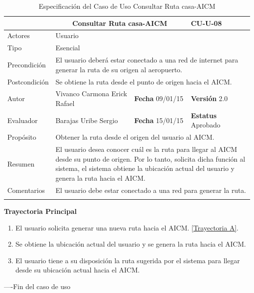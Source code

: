 \begin{longtable}{|p{2.5cm}|p{6.4cm}|p{2cm}|p{2cm}|}
	\hline
		\rowcolor[RGB]{51,153,255}{Caso de Uso}&\multicolumn{2}{c}{Consultar Ruta casa-AICM}&{\textbf{CU-U-08}}\\
	\hline
		{Actores}&\multicolumn{3}{p{11.2cm}|}{Usuario}\\
	\hline
		{Tipo}&\multicolumn{3}{p{11.2cm}|}{Esencial}\\
	\hline
		{Precondición}&\multicolumn{3}{p{11.2cm}|}{El usuario deberá estar conectado a una red de internet para generar la ruta de su origen al aeropuerto.}\\
	\hline
		{Postcondición}&\multicolumn{3}{p{11.2cm}|}{Se obtiene la ruta desde el punto de origen hacia el AICM.}\\
	\hline
		{Autor}&{Vivanco Carmona Erick Rafael}&{\textbf{Fecha} 09/01/15}&{\textbf{Versión} 2.0}\\
			\hline
		{Evaluador}&{Barajas Uribe Sergio}&{\textbf{Fecha} 15/01/15}&{\textbf{Estatus} Aprobado}\\
	\hline
		{Propósito}&\multicolumn{3}{p{11.2cm}|}{Obtener la ruta desde el origen del usuario al AICM.}\\
	\hline
		{Resumen}&\multicolumn{3}{p{11.2cm}|}{El usuario desea conocer cuál es la ruta para llegar al AICM desde su punto de origen. Por lo tanto, solicita dicha función al sistema, el sistema obtiene la ubicación actual del usuario y  genera la ruta hacia el AICM.}\\	
	\hline
		{Comentarios}&\multicolumn{3}{p{11.2cm}|}{El usuario debe estar conectado a una red para generar la ruta.}\\
	\hline
	\caption[Especificación del Caso de Uso Consultar Ruta casa-AICM]{Especificación del Caso de Uso Consultar Ruta casa-AICM}
    	\label{tab:cuConsultarRutacasa-AICM}
\end{longtable}
\clearpage

\begin{flushleft}
	\textbf{Trayectoria Principal}\\
	\begin{enumerate}
		\item El usuario solicita generar una nueva ruta hacia el AICM. \hyperlink{TrayectoriaA_CU-U-08}{[Trayectoria A]}.
		\item Se obtiene la ubicación actual del usuario y se genera la ruta hacia el AICM.
		\item El usuario tiene a su disposición la ruta sugerida por el sistema para llegar desde su ubicación actual hacia el AICM.
	\end{enumerate}
\end{flushleft}
----Fin del caso de uso

